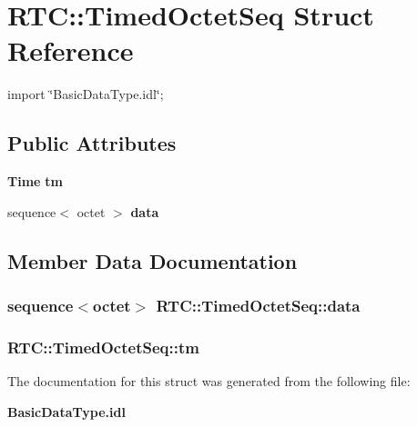 \section{RTC::TimedOctetSeq Struct Reference}
\label{structRTC_1_1TimedOctetSeq}


{\ttfamily import \char`\"{}BasicDataType.idl\char`\"{};}

\subsection*{Public Attributes}
\begin{DoxyCompactItemize}
\item 
{\bf Time} {\bf tm}
\item 
sequence$<$ octet $>$ {\bf data}
\end{DoxyCompactItemize}


\subsection{Member Data Documentation}
\subsubsection[{data}]{\setlength{\rightskip}{0pt plus 5cm}sequence$<$octet$>$ {\bf RTC::TimedOctetSeq::data}}\label{structRTC_1_1TimedOctetSeq_a659ad5fe695a61f77ff3062fd3eec0e8}
\subsubsection[{tm}]{ {\bf RTC::TimedOctetSeq::tm}}\label{structRTC_1_1TimedOctetSeq_ae817c7f813ca89b392711dca53dc8c42}


The documentation for this struct was generated from the following file:\begin{DoxyCompactItemize}
\item 
{\bf BasicDataType.idl}\end{DoxyCompactItemize}
